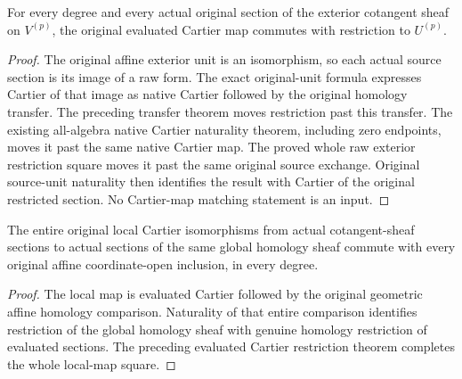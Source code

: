 \begin{theorem}
\label{thm:cartier-geometric-evaluated-cartier-restriction}
\leanok
{}
For every degree and every actual original section of the exterior
cotangent sheaf on $V^{(p)}$, the original evaluated Cartier map
commutes with restriction to $U^{(p)}$.
\end{theorem}
\begin{proof}
The original affine exterior unit is an isomorphism, so each
actual source section is its image of a raw form. The exact
original-unit formula expresses Cartier of that image as native
Cartier followed by the original homology transfer. The preceding
transfer theorem moves restriction past this transfer. The
existing all-algebra native Cartier naturality theorem, including
zero endpoints, moves it past the same native Cartier map. The
proved whole raw exterior restriction square moves it past the
same original source exchange. Original source-unit naturality
then identifies the result with Cartier of the original restricted
section. No Cartier-map matching statement is an input.
\end{proof}

\begin{theorem}
\label{thm:cartier-geometric-global-homology-cartier-restriction}
\leanok
{}
The entire original local Cartier isomorphisms from actual
cotangent-sheaf sections to actual sections of the same global
homology sheaf commute with every original affine coordinate-open
inclusion, in every degree.
\end{theorem}
\begin{proof}
The local map is evaluated Cartier followed by the original
geometric affine homology comparison. Naturality of that entire
comparison identifies restriction of the global homology sheaf
with genuine homology restriction of evaluated sections. The
preceding evaluated Cartier restriction theorem completes the
whole local-map square.
\end{proof}
